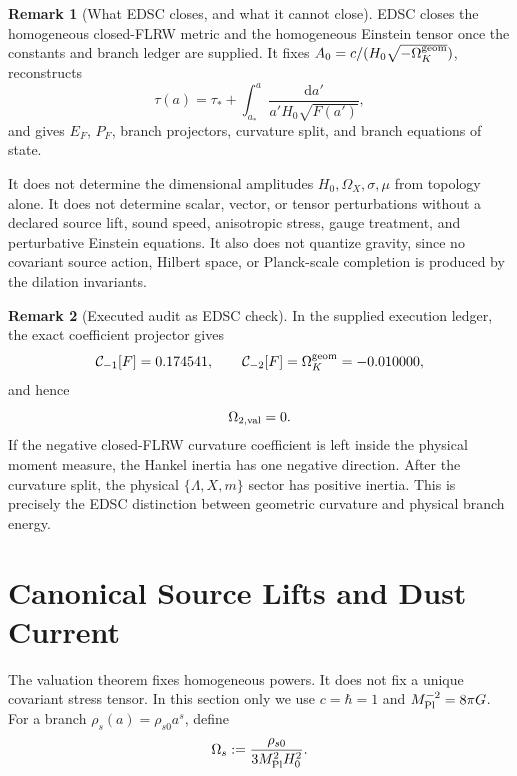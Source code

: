 \documentclass[aps,prd,preprint,onecolumn,nofootinbib,superscriptaddress,showkeys]{revtex4-2}
\numberwithin{equation}{section}
\theoremstyle{definition}
\newtheorem{remark}{Remark}[section]
\theoremstyle{plain}
\newcommand{\dd}{\mathrm d}
\begin{document}
\begin{remark}[What EDSC closes, and what it cannot close]
EDSC closes the homogeneous closed-FLRW metric and the homogeneous Einstein tensor once the constants and branch ledger are supplied.  It fixes \(A_0=c/(H_0\sqrt{-\Omega_K^{\rm geom}})\), reconstructs
\[
\tau(a)=\tau_*+\int_{a_*}^{a}\frac{\dd a'}{a'H_0\sqrt{F(a')}},
\]
and gives \(E_F\), \(P_F\), branch projectors, curvature split, and branch equations of state.

It does not determine the dimensional amplitudes \(H_0,\Omega_X,\sigma,\mu\) from topology alone.  It does not determine scalar, vector, or tensor perturbations without a declared source lift, sound speed, anisotropic stress, gauge treatment, and perturbative Einstein equations.  It also does not quantize gravity, since no covariant source action, Hilbert space, or Planck-scale completion is produced by the dilation invariants.
\end{remark}

\begin{remark}[Executed audit as EDSC check]
In the supplied execution ledger, the exact coefficient projector gives
\[
\mathcal C_{-1}[F]=0.174541,
\qquad
\mathcal C_{-2}[F]=\Omega_K^{\rm geom}=-0.010000,
\]
and hence
\[
\Omega_{2,{\rm val}}=0.
\]
If the negative closed-FLRW curvature coefficient is left inside the physical moment measure, the Hankel inertia has one negative direction.  After the curvature split, the physical \(\{\Lambda,X,m\}\) sector has positive inertia.  This is precisely the EDSC distinction between geometric curvature and physical branch energy.
\end{remark}


\section{Canonical Source Lifts and Dust Current}

The valuation theorem fixes homogeneous powers.  It does not fix a unique covariant stress tensor.  In this section only we use \(c=\hbar=1\) and \(M_{\rm Pl}^{-2}=8\pi G\).  For a branch \(\rho_s(a)=\rho_{s0}a^s\), define
\begin{equation}
\Omega_s:=\frac{\rho_{s0}}{3M_{\rm Pl}^2H_0^2}.
\end{equation}
\end{document}
